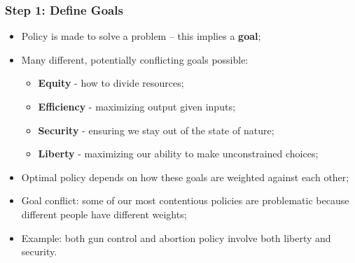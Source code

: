 \documentclass[aspectratio=169]{beamer}
\theoremstyle{principle}
\begin{document}
\begin{frame}
\frametitle{Step 1: Define Goals}
\begin{itemize}
\item Policy is made to solve a problem -- this implies a \textbf{goal};
\bigskip
\item Many different, potentially conflicting goals possible:
\begin{itemize}
\item \textbf{Equity} - how to divide resources;
\item \textbf{Efficiency} - maximizing output given inputs;
\item \textbf{Security} - ensuring we stay out of the state of nature;
\item \textbf{Liberty} - maximizing our ability to make unconstrained choices;
\end{itemize}
\bigskip
\item Optimal policy depends on how these goals are weighted against each other;
\bigskip
\item Goal conflict: some of our most contentious policies are problematic because different people have different weights;
\bigskip
\item Example: both gun control and abortion policy involve both liberty and security.
\end{itemize}
\end{frame}
\end{document}
